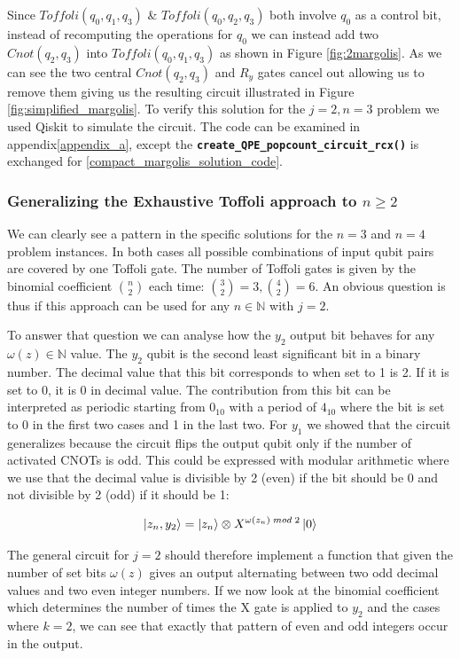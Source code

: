 \documentclass[12pt,a4paper]{article}
\begin{document}
Since \(Toffoli(q_0,q_1,q_3)\) \& \(Toffoli(q_0,q_2,q_3)\) both involve \(q_0\) as a control bit, instead of recomputing the operations for \(q_0\) we can instead add two \(Cnot(q_2,q_3)\) into \(Toffoli(q_0,q_1,q_3)\) as shown in Figure \ref{fig:2margolis}.
As we can see the two central \(Cnot(q_2,q_3)\) and \(R_y\) gates cancel out allowing us to remove them giving us the resulting circuit illustrated in Figure \ref{fig:simplified_margolis}. To verify this solution for the \(j=2,n=3\) problem we used Qiskit to simulate the circuit. The code can be examined in appendix\ref{appendix_a}, except the \texttt{\textbf{create\_QPE\_popcount\_circuit\_rcx()}}
 is exchanged for \ref{compact_margolis_solution_code}.


\subsubsection{Generalizing the Exhaustive Toffoli approach to \( n \ge 2\)}

We can clearly see a pattern in the specific solutions for the \(n=3\) and \(n=4\) problem instances. In both cases all possible combinations of input qubit pairs are covered by one Toffoli gate. The number of Toffoli gates is given by the binomial coefficient \(\binom{n}{2}\) each time: \(\binom{3}{2} = 3, \binom{4}{2} = 6\). An obvious question is thus if this approach can be used for any \(n \in \mathbb{N}\) with \(j=2\).

To answer that question we can analyse how the \(y_2\) output bit behaves for any \(\omega(z) \in \mathbb{N}\) value. The \(y_2\) qubit is the second least significant bit in a binary number. The decimal value that this bit corresponds to when set to 1 is 2. If it is set to 0, it is 0 in decimal value. The contribution from this bit can be interpreted as periodic starting from \(0_{10}\) with a period of \(4_{10}\) where the bit is set to 0 in the first two cases and 1 in the last two. For \(y_1\) we showed that the circuit generalizes because the circuit flips the output qubit only if the number of activated CNOTs is odd. This could be expressed with modular arithmetic where we use that the decimal value is divisible by 2 (even) if the bit should be 0 and not divisible by 2 (odd) if it should be 1:

\[\ket{z_n, y_2} = \ket{z_n} \otimes X^{\omega(z_n) \; mod \; 2}\ket{0}\]

The general circuit for \(j=2\) should therefore implement a function that given the number of set bits \(\omega(z)\) gives an output alternating between two odd decimal values and two even integer numbers. If we now look at the binomial coefficient which determines the number of times the X gate is applied to \(y_2\) and the cases where \(k=2\), we can see that exactly that pattern of even and odd integers occur in the output.
\end{document}
